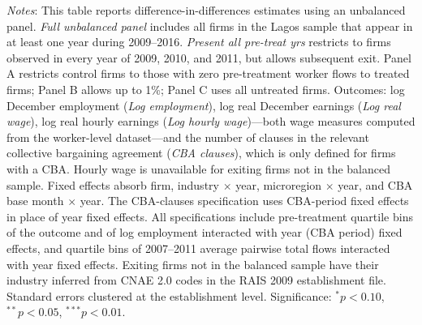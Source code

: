 \begin{table}[H]
\begin{minipage}{\textwidth}
\textit{Notes}: This table reports difference-in-differences estimates using an unbalanced panel. \textit{Full unbalanced panel} includes all firms in the Lagos sample that appear in at least one year during 2009--2016. \textit{Present all pre-treat yrs} restricts to firms observed in every year of 2009, 2010, and 2011, but allows subsequent exit. Panel A restricts control firms to those with zero pre-treatment worker flows to treated firms; Panel B allows up to 1\%; Panel C uses all untreated firms. Outcomes: log December employment (\textit{Log employment}), log real December earnings (\textit{Log real wage}), log real hourly earnings (\textit{Log hourly wage})---both wage measures computed from the worker-level dataset---and the number of clauses in the relevant collective bargaining agreement (\textit{CBA clauses}), which is only defined for firms with a CBA. Hourly wage is unavailable for exiting firms not in the balanced sample. Fixed effects absorb firm, industry $\times$ year, microregion $\times$ year, and CBA base month $\times$ year. The CBA-clauses specification uses CBA-period fixed effects in place of year fixed effects. All specifications include pre-treatment quartile bins of the outcome and of log employment interacted with year (CBA period) fixed effects, and quartile bins of 2007--2011 average pairwise total flows interacted with year fixed effects. Exiting firms not in the balanced sample have their industry inferred from CNAE 2.0 codes in the RAIS 2009 establishment file. Standard errors clustered at the establishment level. Significance: $^{*}p{<}0.10$, $^{**}p{<}0.05$, $^{***}p{<}0.01$.
\end{minipage}
\end{table}
